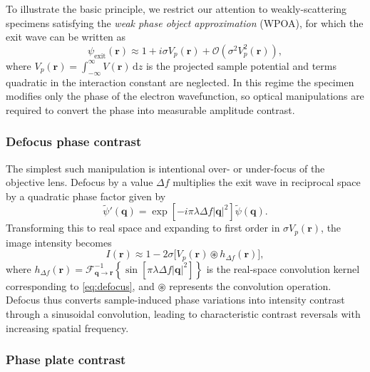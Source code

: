 \documentclass[pdflatex,sn-aps,iicol]{sn-jnl}%
\begin{document}
To illustrate the basic principle, we restrict our attention to weakly-scattering specimens satisfying the \emph{weak phase object approximation} (WPOA), for which the exit wave can be written as~\cite{Vulovic_2014}
\begin{equation}
  \psi_{\text{exit}}(\boldsymbol{r}) \approx 1 + i \sigma V_p(\boldsymbol{r}) + \mathcal{O}\!\left(\sigma^2 V_p^2(\boldsymbol{r})\right),
  \label{eq:wpoa}
\end{equation}
where $V_p(\boldsymbol{r}) = \int_{-\infty}^{\infty} V(\boldsymbol{r})\,\mathrm{d}z$ is the projected sample potential and terms quadratic in the interaction constant are neglected.
In this regime the specimen modifies only the phase of the electron wavefunction, so optical manipulations are required to convert the phase into measurable amplitude contrast.

\subsubsection*{Defocus phase contrast}

The simplest such manipulation is intentional over- or under-focus of the objective lens.
Defocus by a value $\Delta f$ multiplies the exit wave in reciprocal space by a quadratic phase factor given by
\begin{equation}
  \tilde{\psi}'(\boldsymbol{q}) = \exp\!\left[-i \pi \lambda \Delta f \lvert \boldsymbol{q} \rvert^2 \right] \tilde{\psi}(\boldsymbol{q}).
  \label{eq:defocus}
\end{equation}
Transforming this to real space and expanding to first order in $\sigma V_p(\boldsymbol{r})$, the image intensity becomes
\begin{equation}
  I(\boldsymbol{r}) \approx 1 - 2\sigma \bigl[ V_p(\boldsymbol{r}) \circledast h_{\Delta f}(\boldsymbol{r}) \bigr],
  \label{eq:defocus-int}
\end{equation}
where $h_{\Delta f}(\boldsymbol{r}) = \mathcal{F}^{-1}_{\boldsymbol{q}\rightarrow\boldsymbol{r}} \!\left\{ \sin\!\left[\pi \lambda \Delta f \lvert \boldsymbol{q} \rvert^2 \right] \right\}$ is the real-space convolution kernel corresponding to \cref{eq:defocus}, and $\circledast$ represents the convolution operation.
Defocus thus converts sample-induced phase variations into intensity contrast through a sinusoidal convolution, leading to characteristic contrast reversals with increasing spatial frequency.

\subsubsection*{Phase plate contrast}
\end{document}
